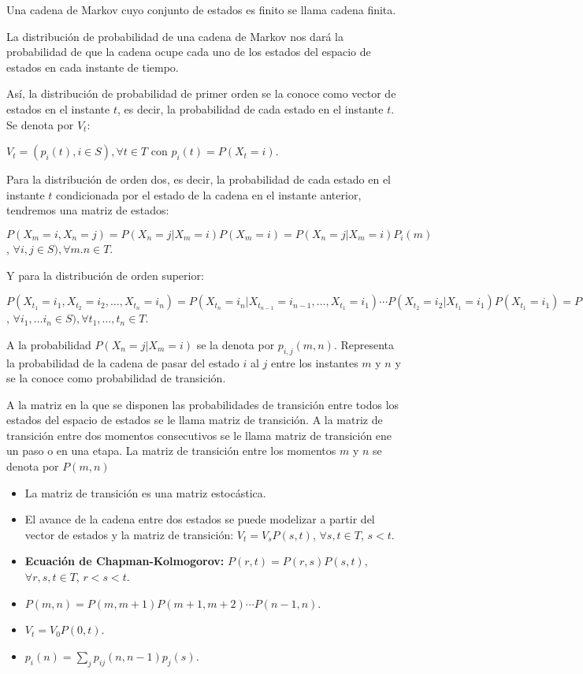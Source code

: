 Una cadena de Markov cuyo conjunto de estados es finito se llama cadena finita.


La distribuci\'on de probabilidad de una cadena de Markov nos dar\'a la probabilidad de que la cadena ocupe cada uno de los estados del espacio de estados en cada instante de tiempo.

As\'i, la distribuci\'on de probabilidad de primer orden se la conoce como vector de estados en el instante $t$, es decir, la probabilidad de cada estado en el instante $t$. Se denota por $V_t$:

$V_t=(p_i(t), i\in S), \forall t\in T$ con $p_i(t)=P(X_t=i)$.

Para la distribuci\'on de orden dos, es decir, la probabilidad de cada estado en el instante $t$ condicionada por el estado de la cadena en el instante anterior, tendremos una matriz de estados:

$P(X_m=i, X_n=j)=P(X_n=j|X_m=i)P(X_m=i)=P(X_n=j|X_m=i)P_i(m)$, $\forall i,j\in S), \forall m.n\in T$.

Y para la distribuci\'on de orden superior:

$P(X_{t_1}=i_1,X_{t_2}=i_2,\ldots,X_{t_n}=i_n)=P(X_{t_n}=i_n|X_{t_{n-1}}=i_{n-1},\ldots,X_{t_1}=i_1)\cdots P(X_{t_2}=i_2|X_{t_1}=i_{1})P(X_{t_1}=i_1)= P(X_{t_n}=i_n|X_{t_{n-1}}=i_{n-1})\cdots P(X_{t_2}=i_2|X_{t_1}=i_{1})P(X_{t_1}=i_1)$, $\forall i_1,\ldots i_n\in S), \forall t_1, \ldots ,t_n\in T$.

A la probabilidad $P(X_n=j|X_m=i)$ se la denota por $p_{i,j}(m,n)$. Representa la probabilidad de la cadena de pasar del estado $i$ al $j$ entre los instantes $m$ y $n$ y se la conoce como probabilidad de transici\'on.

A la matriz en la que se disponen las probabilidades de transici\'on entre todos los estados del espacio de estados se le llama matriz de transici\'on. A la matriz de transici\'on entre dos momentos consecutivos se le llama matriz de transici\'on ene un paso o en una etapa. La matriz de transici\'on entre los momentos $m$ y $n$ se denota por $P(m,n)$
\begin{itemize}
\item La matriz de transici\'on es una matriz estoc\'astica.
\item El avance de la cadena entre dos estados se puede modelizar a partir del vector de estados y la matriz de transici\'on: $V_t=V_sP(s,t)$, $\forall s,t\in T$, $s<t$.
\item \textbf{Ecuaci\'on de Chapman-Kolmogorov:} $P(r,t)=P(r,s)P(s,t)$, $\forall r,s,t\in T$, $r<s<t$.
\item $P(m,n)=P(m,m+1)P(m+1,m+2)\cdots P(n-1,n)$.
\item $V_t=V_0P(0,t)$.
\item $p_i(n)=\sum_jp_{ij}(n,n-1)p_j(s)$.
\end{itemize}


